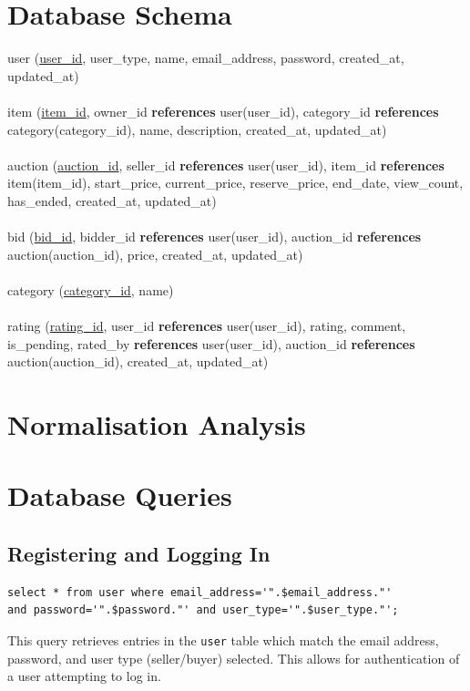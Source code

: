 \documentclass{article}
\begin{document}
\section{Database Schema}

user (\underline{user\_id}, user\_type, name, email\_address, password, created\_at, updated\_at)\\
\\
item (\underline{item\_id}, owner\_id \textbf{references} user(user\_id), category\_id \textbf{references} category(category\_id), name, description, created\_at, updated\_at)\\
\\
auction (\underline{auction\_id}, seller\_id \textbf{references} user(user\_id), item\_id \textbf{references} item(item\_id), start\_price, current\_price, reserve\_price, end\_date, view\_count, has\_ended, created\_at, updated\_at)\\
\\
bid (\underline{bid\_id}, bidder\_id \textbf{references} user(user\_id), auction\_id \textbf{references} auction(auction\_id), price, created\_at, updated\_at)\\
\\
category (\underline{category\_id}, name)\\
\\
rating (\underline{rating\_id}, user\_id \textbf{references} user(user\_id), rating, comment, is\_pending, rated\_by \textbf{references} user(user\_id), auction\_id \textbf{references} auction(auction\_id), created\_at, updated\_at)

\section{Normalisation Analysis}

\section{Database Queries}

\subsection{Registering and Logging In}
\begin{verbatim}
select * from user where email_address='".$email_address."'
and password='".$password."' and user_type='".$user_type."';
\end{verbatim}
This query retrieves entries in the \texttt{user} table which match the email address, password, and user type (seller/buyer) selected. This allows for authentication of a user attempting to log in.
\end{document}

